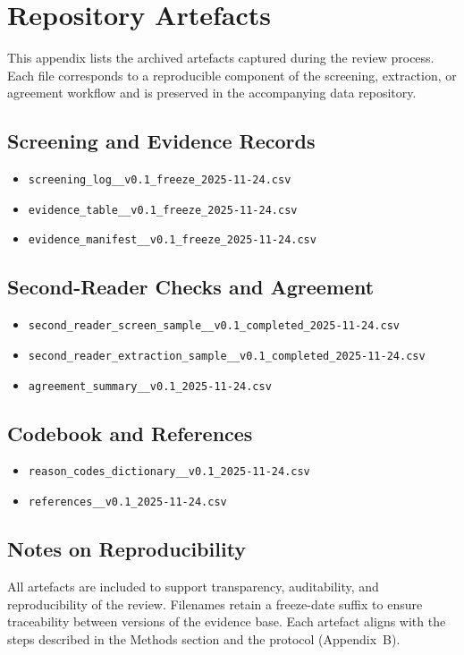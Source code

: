 \section{Repository Artefacts}

This appendix lists the archived artefacts captured during the review process.
Each file corresponds to a reproducible component of the screening, extraction,
or agreement workflow and is preserved in the accompanying data repository.

\subsection{Screening and Evidence Records}

\begin{itemize}
    \item \texttt{screening\_log\_\_v0.1\_freeze\_2025-11-24.csv}
    \item \texttt{evidence\_table\_\_v0.1\_freeze\_2025-11-24.csv}
    \item \texttt{evidence\_manifest\_\_v0.1\_freeze\_2025-11-24.csv}
\end{itemize}

\subsection{Second-Reader Checks and Agreement}

\begin{itemize}
    \item \texttt{second\_reader\_screen\_sample\_\_v0.1\_completed\_2025-11-24.csv}
    \item \texttt{second\_reader\_extraction\_sample\_\_v0.1\_completed\_2025-11-24.csv}
    \item \texttt{agreement\_summary\_\_v0.1\_2025-11-24.csv}
\end{itemize}

\subsection{Codebook and References}

\begin{itemize}
    \item \texttt{reason\_codes\_dictionary\_\_v0.1\_2025-11-24.csv}
    \item \texttt{references\_\_v0.1\_2025-11-24.csv}
\end{itemize}

\subsection{Notes on Reproducibility}

All artefacts are included to support transparency, auditability, and
reproducibility of the review. Filenames retain a freeze-date suffix to ensure
traceability between versions of the evidence base. Each artefact aligns with
the steps described in the Methods section and the protocol (Appendix~B).
